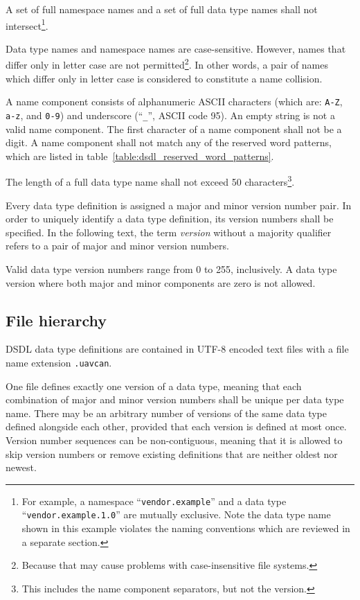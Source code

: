 A set of full namespace names and a set of full data type names shall not intersect\footnote{%
    For example, a namespace ``\texttt{vendor.example}'' and a data type ``\texttt{vendor.example.1.0}''
    are mutually exclusive.
    Note the data type name shown in this example violates the naming conventions
    which are reviewed in a separate section.
}.

Data type names and namespace names are case-sensitive.
However, names that differ only in letter case are not permitted\footnote{%
    Because that may cause problems with case-insensitive file systems.
}.
In other words, a pair of names which differ only in letter case is considered to constitute a name collision.

A name component consists of alphanumeric ASCII characters (which are: \verb|A-Z|, \verb|a-z|, and \verb|0-9|)
and underscore (``\verb|_|'', ASCII code 95).
An empty string is not a valid name component.
The first character of a name component shall not be a digit.
A name component shall not match any of the reserved word patterns,
which are listed in table~\ref{table:dsdl_reserved_word_patterns}.

The length of a full data type name shall not exceed 50
characters\footnote{This includes the name component separators, but not the version.}.

Every data type definition is assigned a major and minor version number pair.
In order to uniquely identify a data type definition, its version numbers shall be specified.
In the following text, the term \emph{version} without a majority qualifier refers to
a pair of major and minor version numbers.

Valid data type version numbers range from 0 to 255, inclusively.
A data type version where both major and minor components are zero is not allowed.

\subsection{File hierarchy}

DSDL data type definitions are contained in UTF-8 encoded text files with a file name extension \verb|.uavcan|.

One file defines exactly one version of a data type,
meaning that each combination of major and minor version numbers shall be unique per data type name.
There may be an arbitrary number of versions of the same data type defined alongside each other,
provided that each version is defined at most once.
Version number sequences can be non-contiguous,
meaning that it is allowed to skip version numbers or remove existing definitions that are neither oldest nor newest.

